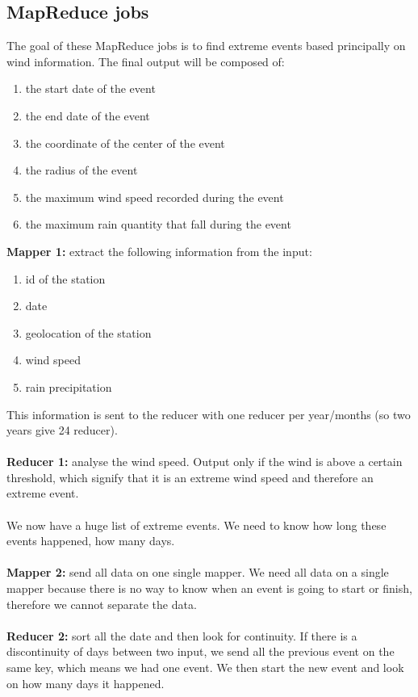 \subsection{MapReduce jobs}
\noindent
The goal of these MapReduce jobs is to find extreme events based principally on wind information. The final output will be composed of:
\begin{enumerate}
\item the start date of the event
\item the end date of the event
\item the coordinate of the center of the event
\item the radius of the event
\item the maximum wind speed recorded during the event
\item the maximum rain quantity that fall during the event
\end{enumerate}
\noindent
\textbf{Mapper 1:} extract the following information from the input:
\begin{enumerate}
\item id of the station
\item date
\item geolocation of the station
\item wind speed
\item rain precipitation
\end{enumerate}
\noindent
This information is sent to the reducer with one reducer per year/months (so two years give 24 reducer).\\
\\
\textbf{Reducer 1:} analyse the wind speed. Output only if the wind is above a certain threshold, which signify that it is an extreme wind speed and therefore an extreme event.\\
\\
We now have a huge list of extreme events. We need to know how long these events happened, how many days.\\
\\
\textbf{Mapper 2:} send all data on one single mapper. We need all data on a single mapper because there is no way to know when an event is going to start or finish, therefore we cannot separate the data.\\
\\
\textbf{Reducer 2:} sort all the date and then look for continuity. If there is a discontinuity of days between two input, we send all the previous event on the same key, which means we had one event. We then start the new event and look on how many days it happened.\\
